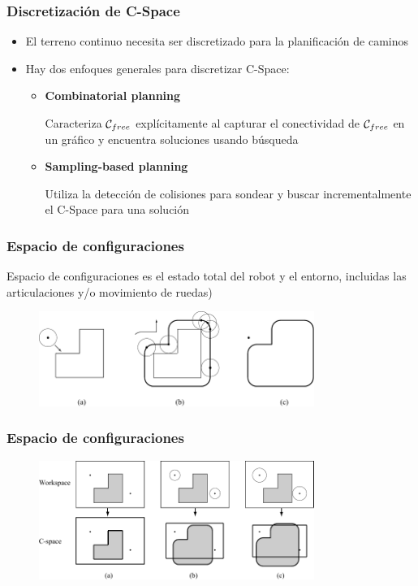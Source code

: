 \begin{frame}
    \frametitle{Discretización de C-Space}
    
    \begin{itemize}
    \item El terreno continuo necesita ser discretizado para la planificación de caminos
    \item Hay dos enfoques generales para discretizar C-Space:
        \begin{itemize}
        \item {\bf Combinatorial planning}
        
        Caracteriza $\mathcal{C}_{free}$ explícitamente al capturar el conectividad de $\mathcal{C}_{free}$ en un gráfico y encuentra soluciones usando búsqueda
        
        \item {\bf Sampling-based planning}
        
            Utiliza la detección de colisiones para sondear y buscar incrementalmente el C-Space para una solución
        \end{itemize}
    \end{itemize}

    
\end{frame}


\begin{frame}
	\frametitle{Espacio de configuraciones}

	Espacio de configuraciones es el estado total del robot y el entorno, incluidas las articulaciones y/o movimiento de ruedas)
	
	\begin{figure}[!h]
		\includegraphics[width=0.8\textwidth]{images/configuration_space_obstacle.pdf}
	\end{figure}
	
\end{frame}

\begin{frame}
	\frametitle{Espacio de configuraciones}
	
	\begin{figure}[!h]
		\includegraphics[width=0.8\textwidth]{images/workspace_configuration_space.pdf}
	\end{figure}
	
\end{frame}



